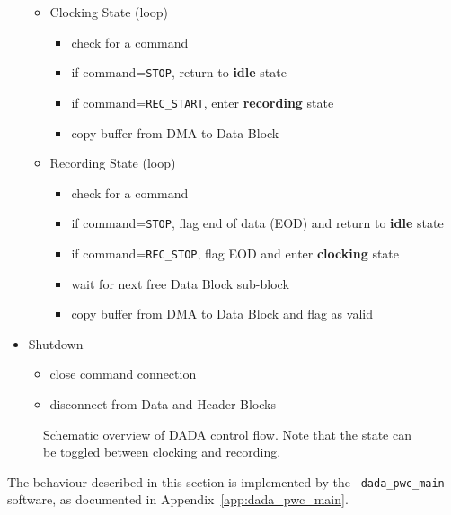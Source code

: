 \begin{itemize}
\begin{itemize}
\begin{itemize}
		\end{itemize}
	\item Clocking State (loop)
	\vspace{-2mm}
		\begin{itemize}
		\item check for a command
		\item if command={\tt STOP}, return to {\bf idle} state
		\item if command={\tt REC\_START}, enter {\bf recording} state
		\item copy buffer from DMA to Data Block
		\end{itemize}
	\item Recording State (loop)
	\vspace{-2mm}
		\begin{itemize}
		\item check for a command
		\item if command={\tt STOP}, flag end of data (EOD) and return to {\bf idle} state
		\item if command={\tt REC\_STOP}, flag EOD and enter {\bf clocking} state
		\item wait for next free Data Block sub-block
		\item copy buffer from DMA to Data Block and flag as valid
		\end{itemize}
	\end{itemize}
\item Shutdown
\vspace{-3mm}
	\begin{itemize}
	\item close command connection
	\item disconnect from Data and Header Blocks
	\end{itemize}
\end{itemize}

\begin{figure}
\centerline{}
\caption [\sffamily DADA Control Flow]
{
Schematic overview of DADA control flow.  Note that the state 
can be toggled between clocking and recording.
}
\label{fig:pwc_state}
\end{figure}

The behaviour described in this section is implemented by the {\tt
dada\_pwc\_main} software, as documented in
Appendix~\ref{app:dada_pwc_main}.
